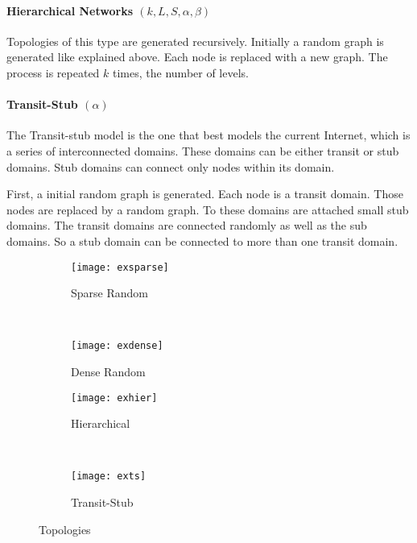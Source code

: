 \paragraph{Hierarchical Networks $(k, L, S, \alpha, \beta)$} Topologies of this type are generated recursively. Initially a random graph is generated like explained above. Each node is replaced with a new graph. The process is repeated $k$ times, the number of levels.
   
\paragraph{Transit-Stub $(\alpha)$} The Transit-stub model is the one that best models the current Internet, which is a series of interconnected domains\cite{Zagura:1996}. These domains can be either transit or stub domains. Stub domains can connect only nodes within its domain.

First, a initial random graph is generated. Each node is a transit domain. Those nodes are replaced by a random graph. To these domains are attached small stub domains. The transit domains are connected randomly as well as the sub domains. So a stub domain can be connected to more than one transit domain.

\begin{figure}
        \centering
        \begin{subfigure}[b]{0.45\textwidth}
                \texttt{[image: exsparse]}
                \caption{Sparse Random}
                \label{fig:gensparse}
        \end{subfigure}%
        ~ 
        \begin{subfigure}[b]{0.45\textwidth}
                \texttt{[image: exdense]}
                \caption{Dense Random}
                \label{fig:gendense}
        \end{subfigure}

        \begin{subfigure}[b]{0.45\textwidth}
                \texttt{[image: exhier]}
                \caption{Hierarchical}
                \label{fig:genhier}
        \end{subfigure}
        ~ 
        \begin{subfigure}[b]{0.45\textwidth}
                \texttt{[image: exts]}
                \caption{Transit-Stub}
                \label{fig:gents}
        \end{subfigure}
        \caption{Topologies}\label{fig:topo}
\end{figure}
